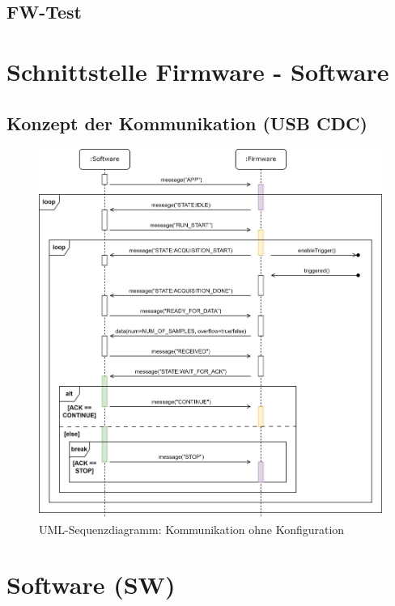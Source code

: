 \documentclass[a4paper, portrait, 12pt]{scrartcl} %
\begin{document}
\pagebreak

\subsection{FW-Test}

\pagebreak

\section{Schnittstelle Firmware - Software}

\subsection{Konzept der Kommunikation (USB CDC)}

\begin{figure}[H]
	\centering
    \includegraphics[scale=0.15]{Sequenzdiagramm_Kommunikation.png} 
	\caption{UML-Sequenzdiagramm: Kommunikation ohne Konfiguration}
	\label{fig:uml_sequence_communication}
\end{figure}

\pagebreak

\section{Software (SW)}
\end{document}
